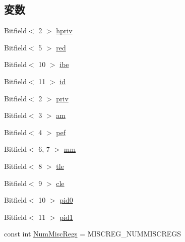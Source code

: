 \subsection*{変数}
\begin{DoxyCompactItemize}
\item 
Bitfield$<$ 2 $>$ \hyperlink{namespaceSparcISA_a0ee6b47193187a7e02e4231aaa050d97}{hpriv}
\item 
Bitfield$<$ 5 $>$ \hyperlink{namespaceSparcISA_a3daf539b069b3e0d79ce6137bac5a47f}{red}
\item 
Bitfield$<$ 10 $>$ \hyperlink{namespaceSparcISA_abdfad74473ff8fc48d79349b5243e166}{ibe}
\item 
Bitfield$<$ 11 $>$ \hyperlink{namespaceSparcISA_a2b4cf644f5af9ebaec502fb09986f302}{id}
\item 
Bitfield$<$ 2 $>$ \hyperlink{namespaceSparcISA_a9d8b751eeaa798163459309b2f3d0b80}{priv}
\item 
Bitfield$<$ 3 $>$ \hyperlink{namespaceSparcISA_a221d874609a3a07e22447f60e33cffdb}{am}
\item 
Bitfield$<$ 4 $>$ \hyperlink{namespaceSparcISA_a203c6c0050f595284b99708df75ea6e4}{pef}
\item 
Bitfield$<$ 6, 7 $>$ \hyperlink{namespaceSparcISA_a972c8e9e2b84cfa215016e3a75909c66}{mm}
\item 
Bitfield$<$ 8 $>$ \hyperlink{namespaceSparcISA_a25942cc15f91eb94cbc97367b68f0366}{tle}
\item 
Bitfield$<$ 9 $>$ \hyperlink{namespaceSparcISA_a4aab5f0f9a9d6bace69a277372b64776}{cle}
\item 
Bitfield$<$ 10 $>$ \hyperlink{namespaceSparcISA_a3ce7de5d72770e56d45a875d8dbd0bed}{pid0}
\item 
Bitfield$<$ 11 $>$ \hyperlink{namespaceSparcISA_a806649f8125578a308f65fe50d13ffdc}{pid1}
\item 
const int \hyperlink{namespaceSparcISA_a568d4aa96dd7cd963f3b1b1b0446c9c6}{NumMiscRegs} = MISCREG\_\-NUMMISCREGS
\end{DoxyCompactItemize}
